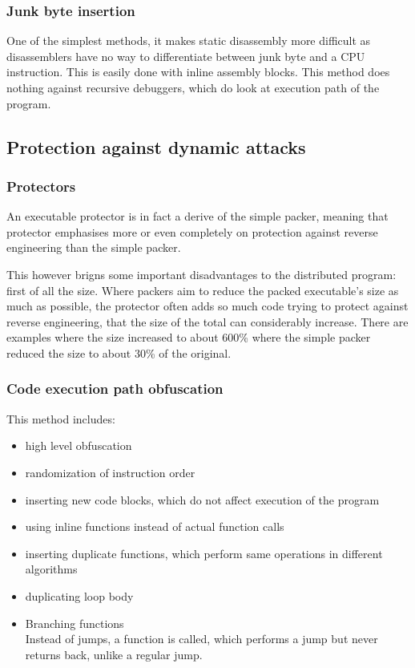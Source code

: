 \documentclass[a4paper,12pt]{article}
\begin{document}
\subsubsection{Junk byte insertion}
    One of the simplest methods, it makes static disassembly more
    difficult as disassemblers have no way to differentiate between junk
    byte and a CPU instruction. This is easily done with inline assembly
    blocks. This method does nothing against recursive debuggers, which
    do look at execution path of the program.

\subsection{Protection against dynamic attacks}

\subsubsection{Protectors}
An executable protector is in fact a derive of the simple packer, meaning
that protector emphasises more or even completely on protection against
reverse engineering than the simple packer.

This however brigns some important disadvantages to the distributed
program: first of all the size. Where packers aim to reduce the packed
executable's size as much as possible, the protector often adds so much
code trying to protect against reverse engineering, that the size of the
total can considerably increase. There are examples where the size
increased to about 600\% where the simple packer reduced the size to about
30\% of the original.

\subsubsection{Code execution path obfuscation}
This method includes:
\begin{itemize}
\item high level obfuscation
\item randomization of instruction order
\item inserting new code blocks, which do not affect execution of the
    program
\item using inline functions instead of actual function calls
\item inserting duplicate functions, which perform same operations in
    different algorithms
\item duplicating loop body
\item Branching functions\\
    Instead of jumps, a function is called, which performs a jump but never
    returns back, unlike a regular jump.
\end{itemize}
\end{document}
